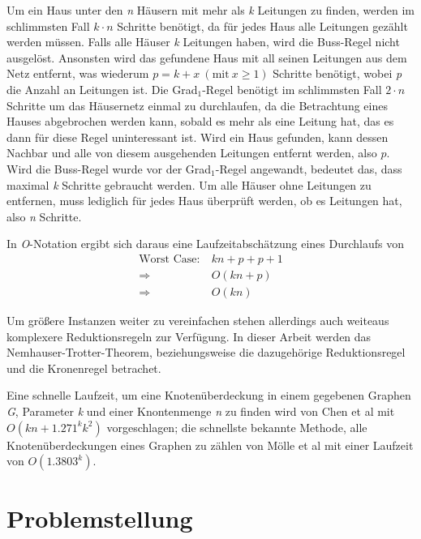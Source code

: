 Um ein Haus unter den \emph{n} Häusern mit mehr als \emph{k} Leitungen zu finden, werden im schlimmsten Fall $k \cdot n$ Schritte benötigt, da für jedes Haus alle Leitungen gezählt werden müssen. Falls alle Häuser \emph{k} Leitungen haben, wird die Buss-Regel nicht ausgelöst. Ansonsten wird das gefundene Haus mit all seinen Leitungen aus dem Netz entfernt, was wiederum $p = k + x\ (\text{mit}\ x \geq 1)$ Schritte benötigt, wobei \emph{p} die Anzahl an Leitungen ist. Die Grad$_{1}$-Regel benötigt im schlimmsten Fall $2 \cdot n$ Schritte um das Häusernetz einmal zu durchlaufen, da die Betrachtung eines Hauses abgebrochen werden kann, sobald es mehr als eine Leitung hat, das es dann für diese Regel uninteressant ist. Wird ein Haus gefunden, kann dessen Nachbar und alle von diesem ausgehenden Leitungen entfernt werden, also $p$. Wird die Buss-Regel wurde vor der Grad$_{1}$-Regel angewandt, bedeutet das, dass maximal \emph{k} Schritte gebraucht werden. Um alle Häuser ohne Leitungen zu entfernen, muss lediglich für jedes Haus überprüft werden, ob es Leitungen hat, also \emph{n} Schritte.




In \emph{O}-Notation ergibt sich daraus eine Laufzeitabschätzung eines Durchlaufs von
\begin{align}
\text{Worst Case}:\ & kn + p + p + 1\\
\Rightarrow\ & O(kn + p)\\
\Rightarrow\ & O(kn)
\end{align}

Um größere Instanzen weiter zu vereinfachen stehen allerdings auch weiteaus komplexere Reduktionsregeln zur Verfügung. In dieser Arbeit werden das Nemhauser-Trotter-Theorem, beziehungsweise die dazugehörige Reduktionsregel und die Kronenregel betrachet.


Eine schnelle Laufzeit, um eine Knotenüberdeckung in einem gegebenen Graphen \emph{G}, Parameter \emph{k} und einer Knontenmenge \emph{n} zu finden wird von Chen et al \cite{paper:4} mit $O(kn + 1.271^{k}k^{2})$ vorgeschlagen; die schnellste bekannte Methode, alle Knotenüberdeckungen eines Graphen zu zählen von Mölle et al \cite{paper:5} mit einer Laufzeit von $O(1.3803^{k})$.

\section{Problemstellung}
\label{ch:Einleitung:sec:Problemstellung}

